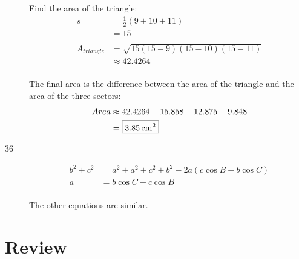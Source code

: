 \documentclass{exam}
\begin{document}
\begin{description}
        Find the area of the triangle:
        \begin{align*}
          s  & = \frac{1}{2}(9 + 10 + 11) \\
             & = 15 \\
          \\
          A_{triangle} & = \sqrt{15 (15 - 9)(15 - 10) (15 - 11)} \\
                       & \approx 42.4264 \\
        \end{align*}

        The final area is the difference between the area of the triangle and the area of the three sectors:
        \begin{align*}
          Area & \approx 42.4264 - 15.858 - 12.875 - 9.848 \\
               & = \boxed{ \unit[3.85]{cm^2} } \\
        \end{align*}

      \item[36]
        \begin{align*}
          b^2 + c^2 & = a^2 + a^2 + c^2 + b^2 - 2a (c \cos B + b \cos C) \\
           a        & = b \cos C + c \cos B  \\
        \end{align*}

        The other equations are similar.

    \end{description}

    \pagebreak
  \fi

  \section{Review}
\end{document}
